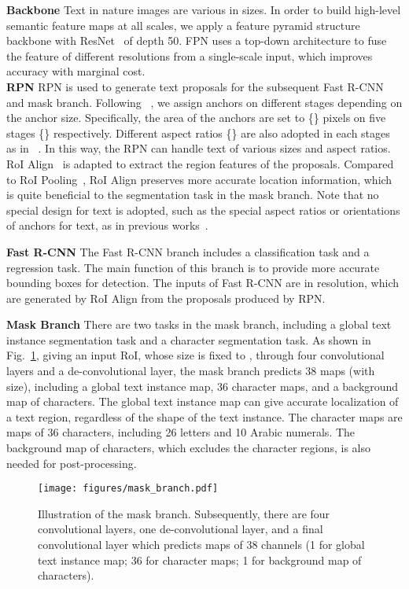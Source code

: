 \documentclass[runningheads]{llncs}
\begin{document}
\noindent\textbf{Backbone} Text in nature images are various in sizes. In order to build high-level semantic feature maps at all scales, we apply a feature pyramid structure~\cite{lin2017feature} backbone with ResNet~\cite{resnet} of depth 50.
FPN uses a top-down architecture to fuse the feature of different resolutions from a single-scale input,  which improves accuracy with marginal cost.
\\
\textbf{RPN}
RPN is used to generate text proposals for the subsequent Fast R-CNN and mask branch. Following ~\cite{lin2017feature}, we assign anchors on different stages depending on the anchor size. Specifically, the area of the anchors are set to \{\} pixels on five stages \{\} respectively. Different aspect ratios \{\} are also adopted in each stages as in ~\cite{ren2015faster}. In this way, the RPN can handle text of various sizes and aspect ratios. RoI Align~\cite{he2017mask} is adapted to extract the region features of the proposals. Compared to RoI Pooling~\cite{fastrcnn}, RoI Align preserves more accurate location information, which is quite beneficial to the segmentation task in the mask branch. Note that no special design for text is adopted, such as the special aspect ratios or orientations of anchors for text, as in previous works~\cite{liao2017textboxes,he2017single,liu2017deep}.

\noindent\textbf{Fast R-CNN}
The Fast R-CNN branch includes a classification task and a regression task. The main function of this branch is to provide more accurate bounding boxes for detection. The inputs of Fast R-CNN are in  resolution, which are generated by RoI Align from the proposals produced by RPN.

\noindent\textbf{Mask Branch}
There are two tasks in the mask branch, including a global text instance segmentation task and a character segmentation task. As shown in Fig.~\ref{fig:mask_branch}, giving an input RoI, whose size is fixed to , through four convolutional layers and a de-convolutional layer, the mask branch predicts 38 maps (with  size), including a global text instance map, 36 character maps, and a background map of characters. 
The global text  instance map can give accurate localization of a text region, regardless of the shape of the text instance.
The character maps are maps of 36 characters, including 26 letters and 10 Arabic numerals. The background map of characters, which excludes the character regions, is also needed for post-processing.

\begin{figure}[!b]
\begin{center}
\texttt{[image: figures/mask\_branch.pdf]}
\end{center}
\caption{Illustration of the mask branch. Subsequently, there are four convolutional layers, one de-convolutional layer, and a final convolutional layer which predicts maps of 38 channels (1 for global text instance map; 36 for character maps; 1 for background map of characters).}
\label{fig:mask_branch}
\end{figure}
\end{document}
